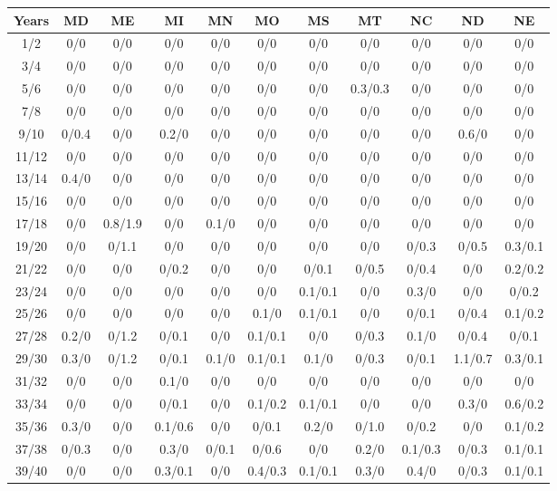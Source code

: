 \begin{table*}[htb]
\footnotesize
    \centering
    \begin{tabular}{|c| c c c c c c c c c c |}\hline
        \textbf{Years} & \textbf{MD}& \textbf{ME}& \textbf{MI}& \textbf{MN}& \textbf{MO}& \textbf{MS}& \textbf{MT}& \textbf{NC}& \textbf{ND}& \textbf{NE} \\\hline
    1/2&0/0& 0/0& 0/0& 0/0& 0/0& 0/0& 0/0& 0/0& 0/0& 0/0\\\hline
3/4&0/0& 0/0& 0/0& 0/0& 0/0& 0/0& 0/0& 0/0& 0/0& 0/0\\\hline
5/6&0/0& 0/0& 0/0& 0/0& 0/0& 0/0& 0.3/0.3& 0/0& 0/0& 0/0\\\hline
7/8&0/0& 0/0& 0/0& 0/0& 0/0& 0/0& 0/0& 0/0& 0/0& 0/0\\\hline
9/10&0/0.4& 0/0& 0.2/0& 0/0& 0/0& 0/0& 0/0& 0/0& 0.6/0& 0/0\\\hline
11/12&0/0& 0/0& 0/0& 0/0& 0/0& 0/0& 0/0& 0/0& 0/0& 0/0\\\hline
13/14&0.4/0& 0/0& 0/0& 0/0& 0/0& 0/0& 0/0& 0/0& 0/0& 0/0\\\hline
15/16&0/0& 0/0& 0/0& 0/0& 0/0& 0/0& 0/0& 0/0& 0/0& 0/0\\\hline
17/18&0/0& 0.8/1.9& 0/0& 0.1/0& 0/0& 0/0& 0/0& 0/0& 0/0& 0/0\\\hline
19/20&0/0& 0/1.1& 0/0& 0/0& 0/0& 0/0& 0/0& 0/0.3& 0/0.5& 0.3/0.1\\\hline
21/22&0/0& 0/0& 0/0.2& 0/0& 0/0& 0/0.1& 0/0.5& 0/0.4& 0/0& 0.2/0.2\\\hline
23/24&0/0& 0/0& 0/0& 0/0& 0/0& 0.1/0.1& 0/0& 0.3/0& 0/0& 0/0.2\\\hline
25/26&0/0& 0/0& 0/0& 0/0& 0.1/0& 0.1/0.1& 0/0& 0/0.1& 0/0.4& 0.1/0.2\\\hline
27/28&0.2/0& 0/1.2& 0/0.1& 0/0& 0.1/0.1& 0/0& 0/0.3& 0.1/0& 0/0.4& 0/0.1\\\hline
29/30&0.3/0& 0/1.2& 0/0.1& 0.1/0& 0.1/0.1& 0.1/0& 0/0.3& 0/0.1& 1.1/0.7& 0.3/0.1\\\hline
31/32&0/0& 0/0& 0.1/0& 0/0& 0/0& 0/0& 0/0& 0/0& 0/0& 0/0\\\hline
33/34&0/0& 0/0& 0/0.1& 0/0& 0.1/0.2& 0.1/0.1& 0/0& 0/0& 0.3/0& 0.6/0.2\\\hline
35/36&0.3/0& 0/0& 0.1/0.6& 0/0& 0/0.1& 0.2/0& 0/1.0& 0/0.2& 0/0& 0.1/0.2\\\hline
37/38&0/0.3& 0/0& 0.3/0& 0/0.1& 0/0.6& 0/0& 0.2/0& 0.1/0.3& 0/0.3& 0.1/0.1\\\hline
39/40&0/0& 0/0& 0.3/0.1& 0/0& 0.4/0.3& 0.1/0.1& 0.3/0& 0.4/0& 0/0.3& 0.1/0.1\\\hline

\end{tabular}
\end{table*}
